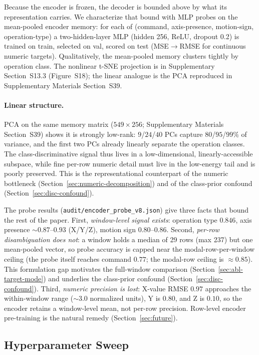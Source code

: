 \documentclass[sensors,article,submit,moreauthors,pdftex]{Definitions/mdpi}
\begin{document}
Because the encoder is frozen, the decoder is bounded above by what its representation carries. We characterize that bound with MLP probes on the mean-pooled encoder memory: for each of (command, axis-presence, motion-sign, operation-type) a two-hidden-layer MLP (hidden 256, ReLU, dropout 0.2) is trained on train, selected on val, scored on test (MSE$\to$RMSE for continuous numeric targets). Qualitatively, the mean-pooled memory clusters tightly by operation class. The nonlinear t-SNE projection is in Supplementary Section~S13.3 (Figure~S18); the linear analogue is the PCA reproduced in Supplementary Materials Section~S39.

\paragraph{Linear structure.} PCA on the same memory matrix ($549 \times 256$; Supplementary Materials Section~S39) shows it is strongly low-rank: $9$/$24$/$40$ PCs capture $80$/$95$/$99\%$ of variance, and the first two PCs already linearly separate the operation classes. The class-discriminative signal thus lives in a low-dimensional, linearly-accessible subspace, while fine per-row numeric detail must live in the low-energy tail and is poorly preserved. This is the representational counterpart of the numeric bottleneck (Section~\ref{sec:numeric-decomposition}) and of the class-prior confound (Section~\ref{sec:disc-confound}).

The probe results (\texttt{audit/encoder\_probe\_v8.json}) give three facts that bound the rest of the paper. First, \emph{window-level signal exists}: operation type $0.846$, axis presence $\sim$$0.87$--$0.93$ (X/Y/Z), motion sign $0.80$--$0.86$. Second, \emph{per-row disambiguation does not}: a window holds a median of 29 rows (max 237) but one mean-pooled vector, so probe accuracy is capped near the modal-row-per-window ceiling (the probe itself reaches command $0.77$; the modal-row ceiling is $\approx\!0.85$). This formulation gap motivates the full-window comparison (Section~\ref{sec:abl-target-mode}) and underlies the class-prior confound (Section~\ref{sec:disc-confound}). Third, \emph{numeric precision is lost}: X-value RMSE $0.97$ approaches the within-window range ($\sim\!3.0$ normalized units), Y is $0.80$, and Z is $0.10$, so the encoder retains a window-level mean, not per-row precision. Row-level encoder pre-training is the natural remedy (Section~\ref{sec:future}).

\subsection{Hyperparameter Sweep}
\label{sec:hp-sweep}
\end{document}
